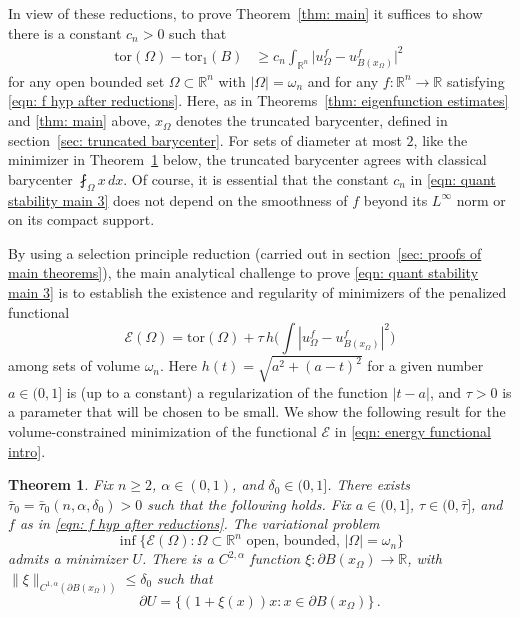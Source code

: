 \documentclass[10pt, reqno]{amsart}
\numberwithin{equation}{section}
\newtheorem{theorem}{Theorem}[section]
\def\R{{\mathbb R}}
\def\W{\Omega}
\def\om{\omega}
\def\tor{\mathrm{tor}}
\def\err{\tau}
\begin{document}
In view of these reductions, to prove Theorem~\ref{thm: main} it suffices to show there is a constant $c_{n}>0$ such that 
\begin{align}
\label{eqn: quant stability main 3}
\tor(\W ) - \tor_1(B)  & \geq c_{n}\int_{\R^n} \big|u_{\W}^f - u_{B(x_\W)}^f\big|^2 \,
\end{align}
for any open bounded set $\W \subset \R^n$ with $|\W| = \om_n$ and for any  $f:\R^n \to \R$ satisfying \eqref{eqn: f hyp after reductions}. Here, as in Theorems~\ref{thm: eigenfunction estimates} and \ref{thm: main} above, $x_\W$  denotes the truncated barycenter, defined in section~\ref{sec: truncated barycenter}. For sets of diameter at most $2$, like the minimizer in Theorem~\ref{thm: summary for minimizers} below, the truncated barycenter agrees with classical barycenter $\fint_\W x\,dx$. Of course, it is essential that  the constant $c_{n}$ in \eqref{eqn: quant stability main 3} does not depend on the smoothness of $f$ beyond its $L^{\infty}$ norm or on its compact support.

By using a selection principle reduction (carried out in section~\ref{sec: proofs of main theorems}), the main analytical challenge to prove \eqref{eqn: quant stability main 3} is to establish the existence and regularity of minimizers of the penalized functional 
\begin{equation}\label{eqn: energy functional intro}
		 \mathcal{E}(\W) = \tor(\W) + \tau \, 
        h\Big(\int |u_\W^f - u_{B(x_\W)}^f|^2  \Big)  
	\end{equation} 
among sets of volume $\om_n$. Here $h(t) =\sqrt{a^2 +(a - t )^2}$ for a given number $a\in(0,1]$ is (up to a constant) a regularization of the function $|t-a|$, and $\tau>0$ is a parameter that will be chosen to be small.
We show the following result for the volume-constrained minimization of the functional $\mathcal{E}$ in \eqref{eqn: energy functional intro}.


\begin{theorem}\label{thm: summary for minimizers} \label{summary ex and reg theorem}
Fix $n\geq 2$, $\alpha\in (0,1)$, and $\delta_0\in (0,1]$. There exists $\bar{\err}_0= \bar{\err}_0(n,\alpha, \delta_0)>0$
such that the following holds. Fix $a\in (0,1]$, $\tau \in (0,\bar{\tau}]$, and $f$ as in \eqref{eqn: f hyp after reductions}. The variational problem 
\begin{equation}
	\label{eqn: main min prob}
\inf \{\mathcal{E}(\W) : \W \subset \R^n \text{ open, bounded, } |\W|= \omega_n\}
\end{equation}
admits a minimizer $U$. There is a $C^{2, \alpha}$ function $\xi: \partial B(x_\W) \to \R$, with  $\| \xi \|_{C^{1,\alpha}(\partial B(x_\W))} \leq \delta_0$ such that 
 \[
 \partial U = \{ (1+\xi(x))x : x \in \partial B(x_\W) \}\,. 
 \]
\end{theorem}
\end{document}

